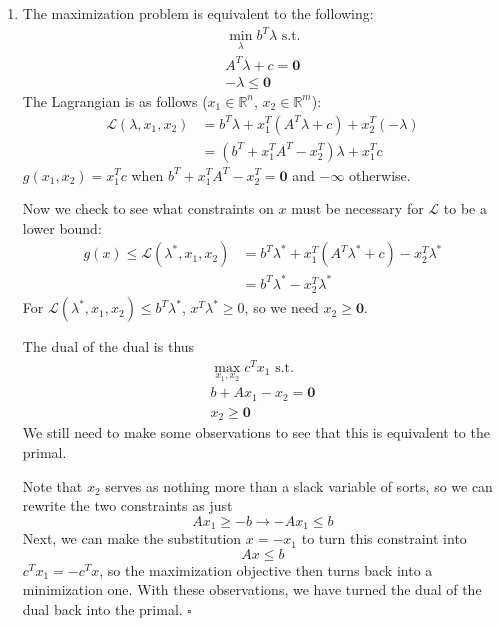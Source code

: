 \documentclass[12pt]{article}
\begin{document}
\begin{enumerate}
      \item The maximization problem is equivalent to the following:
            \begin{gather*}
                  \min_{\lambda} b^T\lambda\text{ s.t.} \\
                  A^T\lambda+c = \mathbf{0} \\
                  -\lambda \le \mathbf{0}
            \end{gather*}
            The Lagrangian is as follows ($x_1 \in \mathbb{R}^n$, $x_2 \in \mathbb{R}^m$):
            \begin{align*}
                  \mathcal{L}(\lambda, x_1, x_2)
                   & =b^T\lambda + x_1^T(A^T\lambda+c) + x_2^T(-\lambda) \\
                   & =(b^T+x_1^TA^T-x_2^T)\lambda+x_1^Tc
            \end{align*}
            $g(x_1, x_2)=x_1^Tc$ when $b^T+x_1^TA^T-x_2^T=\mathbf{0}$ and $-\infty$ otherwise.

            Now we check to see what constraints on $x$ must be necessary for
            $\mathcal{L}$ to be a lower bound:
            \begin{align*}
                  g(x) \le \mathcal{L}(\lambda^*, x_1, x_2)
                   & = b^T\lambda^* + x_1^T(A^T\lambda^*+c) - x_2^T\lambda^* \\
                   & = b^T\lambda^* - x_2^T\lambda^*
            \end{align*}
            For $\mathcal{L}(\lambda^*, x_1, x_2) \le b^T\lambda^*$,
            $x^T\lambda^* \ge 0$, so we need $x_2 \ge \mathbf{0}$.

            The dual of the dual is thus
            \begin{gather*}
                  \max_{x_1, x_2} c^Tx_1\text{ s.t.} \\
                  b+Ax_1-x_2=\mathbf{0} \\
                  x_2 \ge \mathbf{0}
            \end{gather*}
            We still need to make some observations to see that this is equivalent to the primal.

            Note that $x_2$ serves as nothing more than a slack variable of sorts, so
            we can rewrite the two constraints as just
            \[Ax_1 \ge -b \to -Ax_1 \le b\]
            Next, we can make the substitution $x=-x_1$ to turn this constraint into
            \[Ax \le b\]
            $c^Tx_1=-c^Tx$, so the maximization objective then turns back into a minimization one.
            With these observations, we have turned the dual of the dual back into the primal. $\square$


\end{enumerate}
\end{document}
